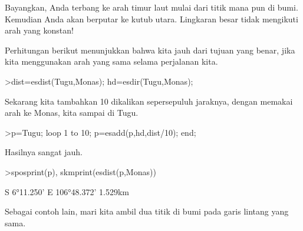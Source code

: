 \documentclass[a4paper,10pt]{article}
\begin{document}
\begin{eulernotebook}
\begin{eulercomment}
\begin{eulercomment}
\begin{eulercomment}
\begin{eulercomment}
\begin{eulercomment}
\begin{eulercomment}
\begin{eulercomment}
\begin{eulercomment}
\begin{eulercomment}
\begin{eulercomment}
\begin{eulercomment}
\begin{eulercomment}
\begin{eulercomment}
\begin{eulercomment}
\begin{eulercomment}
\begin{eulercomment}
\begin{eulercomment}
\begin{eulercomment}
\begin{eulercomment}
\begin{eulercomment}
\begin{eulercomment}
\begin{eulercomment}
\begin{eulercomment}
\begin{eulercomment}
\begin{eulercomment}
\begin{eulercomment}
\begin{eulercomment}
\begin{eulercomment}
\begin{eulercomment}
\begin{eulercomment}
\begin{eulercomment}
\begin{eulercomment}
\begin{eulercomment}
\begin{eulercomment}
\begin{eulercomment}
\begin{eulercomment}
\begin{eulercomment}
\begin{eulercomment}
\begin{eulercomment}
\begin{eulercomment}
\begin{eulercomment}
\begin{eulercomment}
\begin{eulercomment}
Bayangkan, Anda terbang ke arah timur laut mulai dari titik mana pun
di bumi. Kemudian Anda akan berputar ke kutub utara. Lingkaran besar
tidak mengikuti arah yang konstan!

Perhitungan berikut menunjukkan bahwa kita jauh dari tujuan yang
benar, jika kita menggunakan arah yang sama selama perjalanan kita.
\end{eulercomment}
\begin{eulerprompt}
>dist=esdist(Tugu,Monas); hd=esdir(Tugu,Monas);
\end{eulerprompt}
\begin{eulercomment}
Sekarang kita tambahkan 10 dikalikan sepersepuluh jaraknya, dengan
memakai arah ke Monas, kita sampai di Tugu.
\end{eulercomment}
\begin{eulerprompt}
>p=Tugu; loop 1 to 10; p=esadd(p,hd,dist/10); end;
\end{eulerprompt}
\begin{eulercomment}
Hasilnya sangat jauh.
\end{eulercomment}
\begin{eulerprompt}
>sposprint(p), skmprint(esdist(p,Monas))
\end{eulerprompt}
\begin{euleroutput}
  S 6°11.250' E 106°48.372'
       1.529km
\end{euleroutput}
\begin{eulercomment}
Sebagai contoh lain, mari kita ambil dua titik di bumi pada garis
lintang yang sama.
\end{eulercomment}

\end{eulercomment}
\end{eulercomment}
\end{eulercomment}
\end{eulercomment}
\end{eulercomment}
\end{eulercomment}
\end{eulercomment}
\end{eulercomment}
\end{eulercomment}
\end{eulercomment}
\end{eulercomment}
\end{eulercomment}
\end{eulercomment}
\end{eulercomment}
\end{eulercomment}
\end{eulercomment}
\end{eulercomment}
\end{eulercomment}
\end{eulercomment}
\end{eulercomment}
\end{eulercomment}
\end{eulercomment}
\end{eulercomment}
\end{eulercomment}
\end{eulercomment}
\end{eulercomment}
\end{eulercomment}
\end{eulercomment}
\end{eulercomment}
\end{eulercomment}
\end{eulercomment}
\end{eulercomment}
\end{eulercomment}
\end{eulercomment}
\end{eulercomment}
\end{eulercomment}
\end{eulercomment}
\end{eulercomment}
\end{eulercomment}
\end{eulercomment}
\end{eulercomment}
\end{eulercomment}
\end{eulernotebook}
\end{document}
